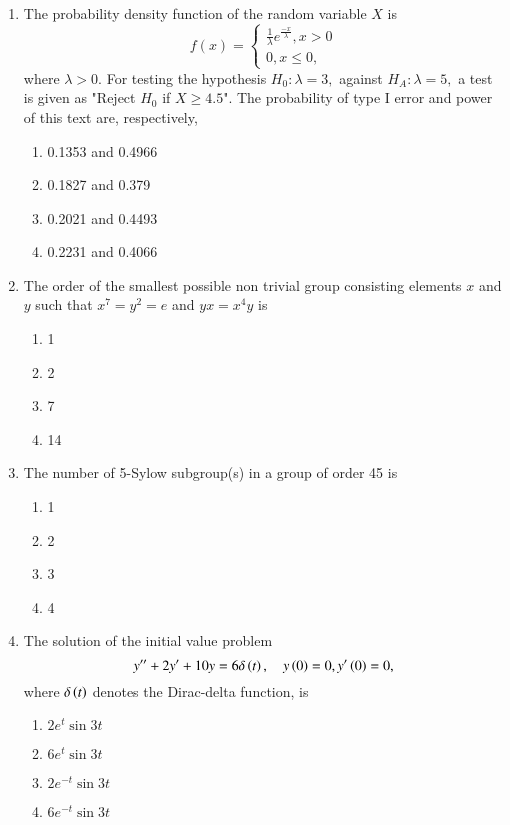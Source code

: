 \documentclass[journal,12pt,onecolumn]{IEEEtran}
\theoremstyle{remark}
\begin{document}
\begin{enumerate}
\begin{enumerate}
    \end{enumerate}
    \item The probability density function of the random variable $X$ is
   \[ f(x)=
    \begin{cases}
        \frac{1}{\lambda}e^\frac{-x}{\lambda},x>0\\
        0, x\leq 0,
    \end{cases}
    \]
    where $\lambda>0$. For testing the hypothesis $H_0:\lambda=3,$ against $H_A:\lambda=5,$ a test is given as "Reject $H_0$ if $X\geq 4.5$". The probability of type I error and power of this text are, respectively,
    \begin{enumerate}
        \item 0.1353 and 0.4966
        \item 0.1827 and 0.379
        \item 0.2021 and 0.4493
        \item 0.2231 and 0.4066
    \end{enumerate}
    \item The order of the smallest possible non trivial group consisting elements $x$ and $y$ such that $x^7=y^2=e$ and $yx=x^4y$ is
    \begin{enumerate}
        \item 1
        \item 2
        \item 7
        \item 14
    \end{enumerate}
    \item The number of 5-Sylow subgroup(s) in a group of order 45 is 
    \begin{enumerate}
        \item 1
        \item 2
        \item 3
        \item 4
    \end{enumerate}
    \item The solution of the initial value problem 
    $$y''+2y^{\prime}+10y=6\delta\left(t\right),\quad y\left(0\right)=0,y^{\prime}\left(0\right)=0,$$ where $\delta\left(t\right)$ denotes the Dirac-delta function, is
    \begin{enumerate}
        \item $2e^{t}\sin 3t$
        \item $6e^{t}\sin 3t$
        \item $2e^{-t}\sin 3t$
        \item $6e^{-t}\sin 3t$

\end{enumerate}
\end{enumerate}
\end{document}
